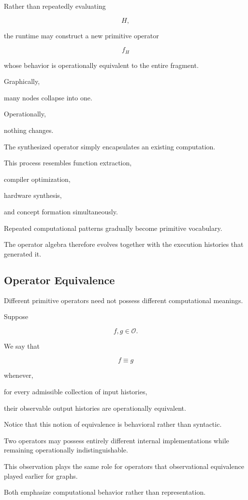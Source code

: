 \documentclass[12pt,oneside]{article}
\begin{document}
Rather than repeatedly evaluating

\[
H,
\]

the runtime may construct a new primitive operator

\[
f_H
\]

whose behavior is operationally equivalent to the entire fragment.

Graphically,

many nodes collapse into one.

Operationally,

nothing changes.

The synthesized operator simply encapsulates an existing computation.

This process resembles function extraction,

compiler optimization,

hardware synthesis,

and concept formation simultaneously.

Repeated computational patterns gradually become primitive vocabulary.

The operator algebra therefore evolves together with the execution histories that generated it.

\subsection{Operator Equivalence}

Different primitive operators need not possess different computational meanings.

Suppose

\[
f,g
\in
\mathcal O.
\]

We say that

\[
f
\equiv
g
\]

whenever,

for every admissible collection of input histories,

their observable output histories are operationally equivalent.

Notice that this notion of equivalence is behavioral rather than syntactic.

Two operators may possess entirely different internal implementations while remaining operationally indistinguishable.

This observation plays the same role for operators that observational equivalence played earlier for graphs.

Both emphasize computational behavior rather than representation.
\end{document}
